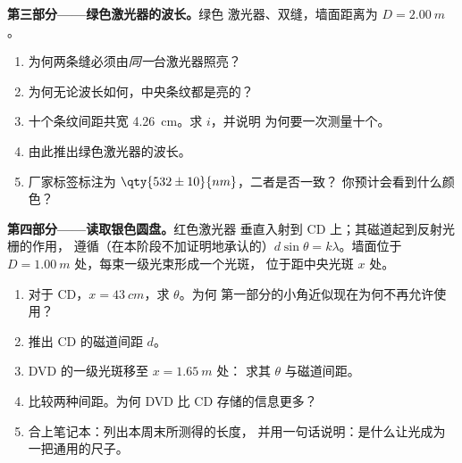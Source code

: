 \begin{problem}
\medskip
\noindent\textbf{第三部分——绿色激光器的波长。}绿色
激光器、双缝，墙面距离为 $D = \qty{2.00}{m}$。
\begin{enumerate}[resume]
  \item 为何两条缝必须由\emph{同一}台激光器照亮？
  \item 为何无论波长如何，中央条纹都是亮的？
  \item 十个条纹间距共宽 \qty{4.26}{cm}。求 $i$，并说明
        为何要一次测量十个。
  \item 由此推出绿色激光器的波长。
  \item 厂家标签标注为 $\qty{532 \pm 10}{nm}$，二者是否一致？
        你预计会看到什么颜色？
\end{enumerate}

\medskip
\noindent\textbf{第四部分——读取银色圆盘。}红色激光器
垂直入射到 CD 上；其磁道起到反射光栅的作用，
遵循（在本阶段不加证明地承认的）$d \sin\theta = k\lambda$。墙面位于 $D =
\qty{1.00}{m}$ 处，每束一级光束形成一个光斑，
位于距中央光斑 $x$ 处。
\begin{enumerate}[resume]
  \item 对于 CD，$x = \qty{43}{cm}$，求 $\theta$。为何
        第一部分的小角近似现在为何不再允许使用？
  \item 推出 CD 的磁道间距 $d$。
  \item DVD 的一级光斑移至 $x = \qty{1.65}{m}$ 处：
        求其 $\theta$ 与磁道间距。
  \item 比较两种间距。为何 DVD 比 CD 存储的信息更多？
  \item 合上笔记本：列出本周末所测得的长度，
        并用一句话说明：是什么让光成为一把通用的尺子。
\end{enumerate}
\end{problem}
